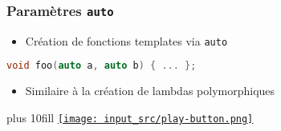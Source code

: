 \documentclass[C++.tex]{subfiles}
\begin{document}
\begin{frame}[fragile]
	\frametitle{Paramètres \lstinline|auto|}
	\begin{itemize}
		\item Création de fonctions templates via \lstinline|auto|
	\end{itemize}

	\begin{lstlisting}[language=C++]
void foo(auto a, auto b) { ... };\end{lstlisting}

	\begin{itemize}
		\item Similaire	à la création de lambdas polymorphiques
	\end{itemize}

	\vskip 10mm plus 10fill
	\hfill
	\href{https://godbolt.org/#g:!((g:!((g:!((h:codeEditor,i:(filename:'1',fontScale:14,fontUsePx:'0',j:1,lang:c%2B%2B,selection:(endColumn:1,endLineNumber:12,positionColumn:1,positionLineNumber:12,selectionStartColumn:1,selectionStartLineNumber:1,startColumn:1,startLineNumber:1),source:'%23include+%3Ciostream%3E%0A%0Aauto+foo(auto+a,+auto+b)%0A%7B%0A++return+a+%2B+b%3B%0A%7D%3B%0A%0Aint+main()%0A%7B%0A++std::cout+%3C%3C+foo(4,+3)+%3C%3C+%22%5Cn%22%3B%0A%7D%0A'),l:'5',n:'0',o:'C%2B%2B+source+%231',t:'0')),k:50,l:'4',n:'0',o:'',s:0,t:'0'),(g:!((h:executor,i:(argsPanelShown:'1',compilationPanelShown:'0',compiler:g122,compilerName:'',compilerOutShown:'0',execArgs:'',execStdin:'',fontScale:14,fontUsePx:'0',j:1,lang:c%2B%2B,libs:!((name:boost,ver:'175')),options:'-std%3Dc%2B%2B20+-Wall+-Wextra+-pedantic',source:1,stdinPanelShown:'1',tree:'1',wrap:'0'),l:'5',n:'0',o:'Executor+x86-64+gcc+12.2+(C%2B%2B,+Editor+%231)',t:'0')),header:(),k:50,l:'4',n:'0',o:'',s:0,t:'0')),l:'2',n:'0',o:'',t:'0')),version:4}{\texttt{[image: input\_src/play-button.png]}}
\end{frame}
\end{document}
